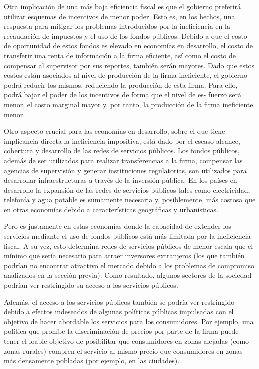 \documentclass[
  12pt,
  spanish,
]{book}
\begin{document}
Otra implicación de una más baja eficiencia fiscal es que el gobierno preferirá utilizar esquemas de incentivos de menor poder. Esto es, en los hechos, una respuesta para mitigar los problemas introducidos por la ineficiencia en la recaudación de impuestos y el uso de los fondos públicos. Debido a que el costo de oportunidad de estos fondos es elevado en economías en desarrollo, el costo de transferir una renta de información a la firma eficiente, así como el costo de compensar al supervisor por sus reportes, también serán mayores. Dado que estos costos están asociados al nivel de producción de la firma ineficiente, el gobierno podrá reducir los mismos, reduciendo la producción de esta firma. Para ello, podrá bajar el poder de los incentivos de forma que el nivel de es-
fuerzo será menor, el costo marginal mayor y, por tanto, la producción de la
firma ineficiente menor.

Otro aspecto crucial para las economías en desarrollo, sobre el que tiene implicancia directa la ineficiencia impositiva, está dado por el escaso alcance, cobertura y desarrollo de las redes de servicios públicos. Los fondos públicos, además de ser utilizados para realizar transferencias a la firma, compensar las agencias de supervisión y generar instituciones regulatorias, son utilizados para desarrollar infraestructuras a través de la inversión pública. En los países en desarrollo la expansión de las redes de servicios públicos tales como electricidad, telefonía y agua potable es sumamente necesaria y, posiblemente, más costosa que en otras economías debido a características geográficas y urbanísticas.

Pero es justamente en estas economías donde la capacidad de extender los servicios mediante el uso de fondos públicos está más limitada por la ineficiencia fiscal. A su vez, esto determina redes de servicios públicos de menor escala que el mínimo que sería necesario para atraer inversores extranjeros (los que también podrían no encontrar atractivo el mercado debido a los problemas de compromiso analizados en la sección previa). Como resultado, algunos sectores de la sociedad podrían ver restringido su acceso a los servicios públicos.

Además, el acceso a los servicios públicos también se podría ver restringido debido a efectos indeseados de algunas políticas públicas impulsadas con el objetivo de hacer abordable los servicios para los consumidores. Por ejemplo, una política que prohíbe la discriminación de precios por parte de la firma puede tener el loable objetivo de posibilitar que consumidores en zonas alejadas (como zonas rurales) compren el servicio al mismo precio que consumidores en zonas más densamente pobladas (por ejemplo, en las ciudades).
\end{document}
